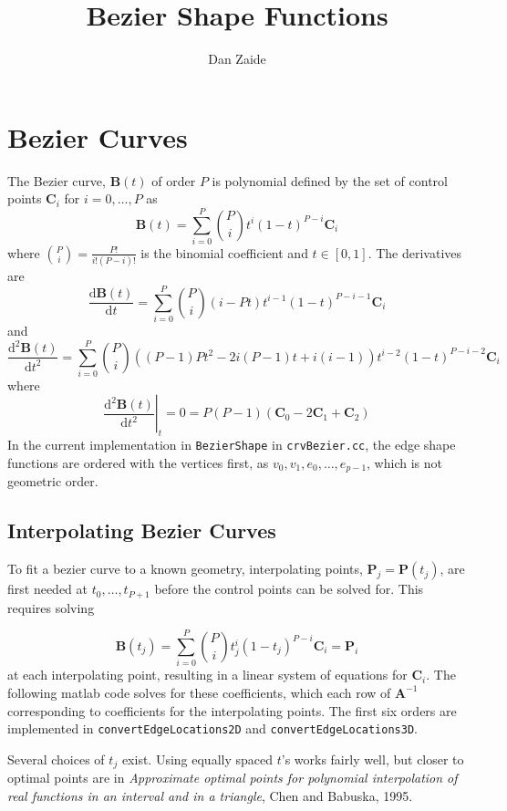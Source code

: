 \documentclass{article}
\title{Bezier Shape Functions}
\author{Dan Zaide}
\begin{document}
\maketitle

\section{Bezier Curves}
The Bezier curve, $\mathbf{B}(t)$ of order $P$ is polynomial defined by the set of control points $\mathbf{C}_i$ for $i = 0,\ldots,P$ as 
\[
\mathbf{B}(t) = \displaystyle \sum_{i=0}^P {P \choose i}t^i(1-t)^{P-i}\mathbf{C}_i
\]
where ${P \choose i}= \frac{P!}{i!(P-i)!}$ is the binomial coefficient and $ t \in [0,1]$. The derivatives are
\[
\frac{\mathrm{d} \mathbf{B}(t)}{\mathrm{d} t} = \displaystyle \sum_{i=0}^P {P \choose i}(i-Pt)t^{i-1}(1-t)^{P-i-1}\mathbf{C}_i
\]
and
\[
\frac{\mathrm{d}^2 \mathbf{B}(t)}{\mathrm{d} t^2} = \displaystyle \sum_{i=0}^P {P \choose i}((P-1)Pt^2-2i(P-1)t+i(i-1))t^{i-2}(1-t)^{P-i-2}\mathbf{C}_i
\]
where
\[\left.\frac{\mathrm{d}^2 \mathbf{B}(t)}{\mathrm{d} t^2}\right|_t=0 = P(P-1)(\mathbf{C}_0-2\mathbf{C}_1+\mathbf{C}_2)\]
In the current implementation in \texttt{BezierShape} in \texttt{crvBezier.cc}, the edge shape functions are ordered with the vertices first, as $v_0,v_1,e_0,\ldots,e_{p-1}$, which is not geometric order.
\subsection{Interpolating Bezier Curves}
To fit a bezier curve to a known geometry, interpolating points, $\mathbf{P}_j = \mathbf{P}(t_j)$, are first needed at $t_0,\ldots, t_{P+1}$ before the control points can be solved for. This requires solving

\[
\mathbf{B}(t_j) = \displaystyle \sum_{i=0}^P {P \choose i}t_j^i(1-t_j)^{P-i}\mathbf{C}_i = \mathbf{P}_i
\]
at each interpolating point, resulting in a linear system of equations for $\mathbf{C}_i$. The following matlab code solves for these coefficients, which each row of $\mathbf{A}^{-1}$ corresponding to coefficients for the interpolating points. The first six orders are implemented in \texttt{convertEdgeLocations2D} and \texttt{convertEdgeLocations3D}.

Several choices of $t_j$ exist. Using equally spaced $t$'s works fairly well, but closer to optimal points are in \textit{Approximate optimal points for polynomial interpolation of real functions in an interval and in a triangle}, Chen and Babuska, 1995.
\end{document}
